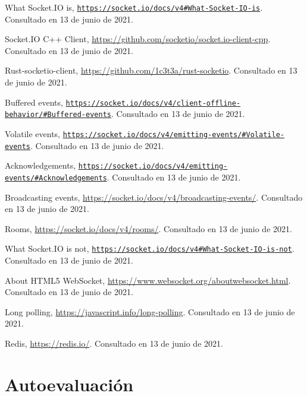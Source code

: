 \documentclass[runningheads]{llncs}
\begin{document}
\begin{thebibliography}{8}
	What Socket.IO is, \href{https://socket.io/docs/v4#What-Socket-IO-is}{\texttt{https://socket.io/docs/v4\#What-Socket-IO-is}}. Consultado en 13 de junio de 2021.

	Socket.IO C++ Client, \url{https://github.com/socketio/socket.io-client-cpp}. Consultado en 13 de junio de 2021.

	Rust-socketio-client, \url{https://github.com/1c3t3a/rust-socketio}. Consultado en 13 de junio de 2021.

	Buffered events, \href{https://socket.io/docs/v4/client-offline-behavior/#Buffered-events}{\texttt{https://socket.io/docs/v4/client-offline-behavior/\#Buffered-events}}. Consultado en 13 de junio de 2021.

	Volatile events, \href{https://socket.io/docs/v4/emitting-events/#Volatile-events}{\texttt{https://socket.io/docs/v4/emitting-events/\#Volatile-events}}. Consultado en 13 de junio de 2021.

	Acknowledgements, \href{https://socket.io/docs/v4/emitting-events/#Acknowledgements}{\texttt{https://socket.io/docs/v4/emitting-events/\#Acknowledgements}}. Consultado en 13 de junio de 2021.

	Broadcasting events, \url{https://socket.io/docs/v4/broadcasting-events/}. Consultado en 13 de junio de 2021.

	Rooms, \url{https://socket.io/docs/v4/rooms/}. Consultado en 13 de junio de 2021.

	What Socket.IO is not, \href{https://socket.io/docs/v4#What-Socket-IO-is-not}{\texttt{https://socket.io/docs/v4\#What-Socket-IO-is-not}}. Consultado en 13 de junio de 2021.

	About HTML5 WebSocket, \url{https://www.websocket.org/aboutwebsocket.html}. Consultado en 13 de junio de 2021.

	Long polling, \url{https://javascript.info/long-polling}. Consultado en 13 de junio de 2021.

	Redis, \url{https://redis.io/}. Consultado en 13 de junio de 2021.
\end{thebibliography}

\vfill
\pagebreak

\section*{Autoevaluación}
\end{document}
